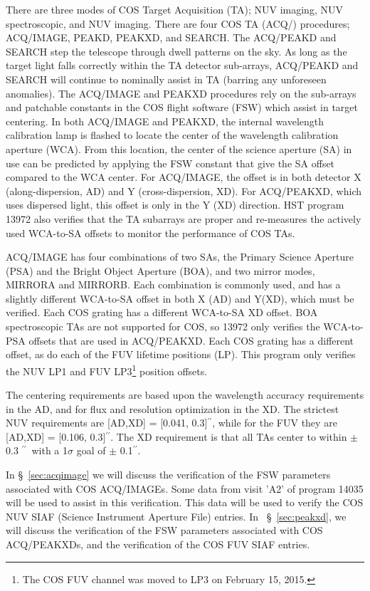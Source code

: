 \documentclass[12pt]{reportj}
\def\arcsec{\hbox{$^{\prime\prime}$}}
\begin{document}
There are three modes of COS Target Acquisition (TA); NUV imaging, NUV spectroscopic, and NUV imaging.
There are four COS TA (ACQ/) procedures; ACQ/IMAGE, PEAKD, PEAKXD, and SEARCH. The ACQ/PEAKD and SEARCH
step the telescope through dwell patterns on the sky. As long as the target light falls correctly within
the TA detector sub-arrays, ACQ/PEAKD and SEARCH will continue to nominally assist in TA (barring any
unforeseen anomalies). The ACQ/IMAGE and PEAKXD procedures rely on the sub-arrays and patchable constants
in the COS flight software (FSW) which assist in target centering. In both ACQ/IMAGE and PEAKXD, the internal
wavelength calibration lamp is flashed to locate the center of the wavelength calibration aperture (WCA). From this location, the center of the
science aperture (SA) in use can be predicted by applying the FSW constant that give the SA offset compared to the WCA center. For ACQ/IMAGE,
the offset is in both detector X (along-dispersion, AD) and Y (cross-dispersion, XD). For ACQ/PEAKXD, which
uses dispersed light, this offset is only in the Y (XD) direction. HST program 13972 also verifies that the TA subarrays
are proper and re-measures the actively used WCA-to-SA offsets to monitor the performance of COS TAs.

ACQ/IMAGE has four combinations of two SAs, the Primary Science Aperture (PSA) and the Bright
Object Aperture (BOA), and two mirror modes, MIRRORA and MIRRORB. Each combination is commonly used, and has a slightly different
WCA-to-SA offset in both X (AD) and Y(XD), which must be verified. Each COS grating has a different WCA-to-SA XD offset.
BOA spectroscopic TAs are not supported for COS, so 13972 only verifies the WCA-to-PSA offsets that are used in ACQ/PEAKXD.
Each COS grating has a different offset, as do each of the FUV lifetime positions (LP). This program only verifies the NUV LP1
and FUV LP3\footnote{The COS FUV channel was moved to LP3 on February 15, 2015.} position offsets.

The centering requirements are based upon the wavelength accuracy requirements in the AD, and for flux and resolution optimization
in the XD. The strictest NUV requirements are [AD,XD] = [0.041, 0.3]\arcsec, while for the FUV they are [AD,XD] = [0.106, 0.3]\arcsec. The XD
requirement is that all TAs center to within $\pm$ 0.3 \arcsec\ with a 1$\sigma$ goal of $\pm$ 0.1\arcsec.

In \S~\ref{sec:acqimage} we will discuss the verification of the FSW parameters associated with COS ACQ/IMAGEs.
Some data from visit 'A2' of program 14035 will be used to assist in this verification. This data will be used to verify
the COS NUV SIAF (Science Instrument Aperture File) entries. In ~\S~\ref{sec:peakxd},
we will discuss the verification of the FSW parameters associated with COS ACQ/PEAKXDs, and the verification of the
COS FUV SIAF entries.
\end{document}
